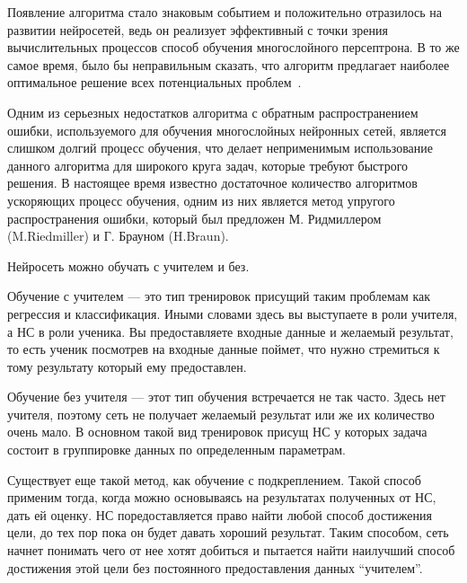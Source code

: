 Появление алгоритма стало знаковым событием и положительно отразилось на развитии нейросетей, ведь он реализует
эффективный с точки зрения вычислительных процессов способ обучения многослойного персептрона. В то же самое время,
было бы неправильным сказать, что алгоритм предлагает наиболее оптимальное решение всех потенциальных
проблем~\cite{Back_propagation_algorithm}.


Одним из серьезных недостатков алгоритма с обратным распространением ошибки, используемого для обучения многослойных
нейронных сетей, является слишком долгий процесс обучения, что делает неприменимым использование данного алгоритма для
широкого круга задач, которые требуют быстрого решения. В настоящее время известно достаточное количество алгоритмов
ускоряющих процесс обучения, одним из них является метод упругого распространения ошибки, который был
предложен М. Ридмиллером (M.Riedmiller) и Г. Брауном (H.Braun).

Нейросеть можно обучать с учителем и без.

Обучение с учителем — это тип тренировок присущий таким проблемам как регрессия и классификация. Иными словами здесь
вы выступаете в роли учителя, а НС в роли ученика. Вы предоставляете входные данные и желаемый результат, то есть
ученик посмотрев на входные данные поймет, что нужно стремиться к тому результату который ему предоставлен.

Обучение без учителя — этот тип обучения встречается не так часто. Здесь нет учителя, поэтому сеть не получает
желаемый результат или же их количество очень мало. В основном такой вид тренировок присущ НС у которых задача
состоит в группировке данных по определенным параметрам.

Существует еще такой метод, как обучение с подкреплением. Такой способ применим тогда, когда можно основываясь на
результатах полученных от НС, дать ей оценку. НС поредоставляется право найти любой способ достижения цели, до тех пор
пока он будет давать хороший результат. Таким способом, сеть начнет понимать чего от нее хотят добиться и пытается
найти наилучший способ достижения этой цели без постоянного предоставления данных “учителем”.
